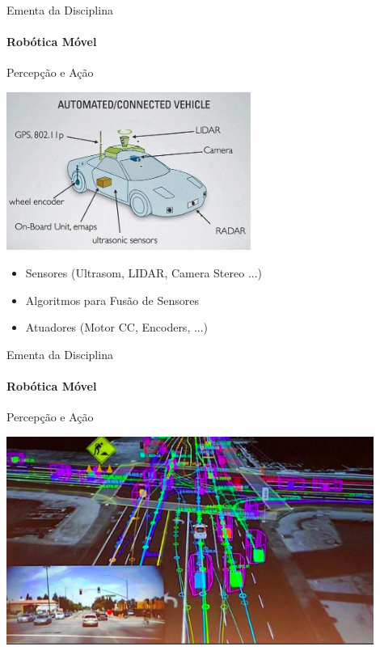 \documentclass{beamer}
\newcommand{\pausar}{\pause}
\begin{document}
\begin{frame}[t]{Ementa da Disciplina}
	\framesubtitle{Robótica Móvel}
	\begin{block}{Percepção e Ação}
	\end{block}
	\begin{center}
		\includegraphics[width=0.6\textwidth]{../images/autonomous-car.png}
	\end{center}
	\pausar
	\begin{itemize}
		\item Sensores (Ultrasom, LIDAR, Camera Stereo ...) \pausar
		\item Algoritmos para Fusão de Sensores \pausar
		\item Atuadores (Motor CC, Encoders, ...)
	\end{itemize}
\end{frame}


\begin{frame}[t]{Ementa da Disciplina}
	\framesubtitle{Robótica Móvel}
	\begin{block}{Percepção e Ação}
	\end{block}
	\begin{center}
		\includegraphics[width=0.9\textwidth]{../images/autonomous-car_2.png}
	\end{center}
\end{frame}
\end{document}
